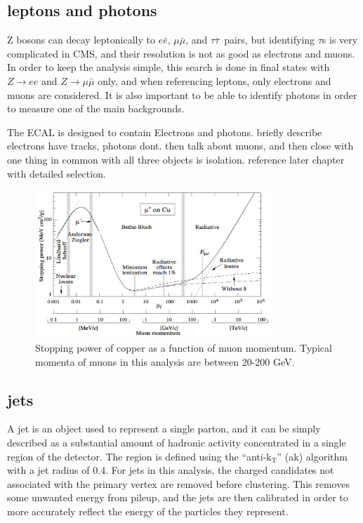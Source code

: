 \subsection{leptons and photons}
\label{ssec:lepsandphots}
Z bosons can decay leptonically to $e\bar{e}$, $\mu\bar{\mu}$, and $\tau\bar{\tau}$~pairs,
but identifying $\tau$s is very complicated in CMS, and their resolution is not as good as electrons and muons.
In order to keep the analysis simple, this search is done in final states with $Z\rightarrow ee$ and $Z\rightarrow\mu\bar{\mu}$ only,
and when referencing leptons, only electrons and muons are considered.
It is also important to be able to identify photons in order to measure one of the main backgrounds.

The ECAL is designed to contain Electrons and photons.
briefly describe electrons have tracks, photons dont.
then talk about muons, and then close with one thing in common with all three objects is isolation.
reference later chapter with detailed selection.


\begin{figure}[!htb]
  \begin{center}
    \includegraphics[width=0.8\textwidth]{cms/figs/muon_energy_loss.pdf}
    \caption{
      \label{fig:muonenergyloss}
      Stopping power of copper as a function of muon momentum. Typical momenta of muons in this analysis are between 20-200 GeV. 
    }
  \end{center}
\end{figure}


\subsection{jets}
\label{ssec:jets}
A jet is an object used to represent a single parton, and it can be simply described as a substantial amount of hadronic activity concentrated in a single region of the detector.
The region is defined using the ``anti-$\mathrm{k_{T}}$'' (ak) algorithm~\cite{antikt} with a jet radius of 0.4.
For jets in this analysis, the charged candidates not associated with the primary vertex are removed before clustering. 
This removes some unwanted energy from pileup, and the jets are then calibrated in order to more accurately reflect the energy of the particles they represent.


